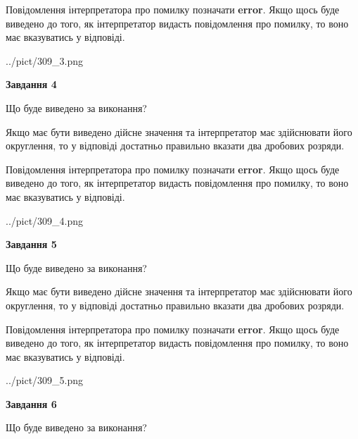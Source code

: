 \documentclass[12pt, ukrainian]{article}
\begin{document}
{\begin {Large}
Повідомлення інтерпретатора про помилку позначати \textbf{error}.
Якщо щось буде виведено до того, як інтерпретатор видасть повідомлення про помилку, 
то воно має вказуватись у відповіді. \par

\begin{center}
	{../pict/309_3.png}
\end{center}
\newpage

{\begin {center}\textbf{Завдання 4}\end {center}}\par
Що буде виведено за виконання? \par

Якщо має бути виведено дійсне значення та інтерпретатор має здійснювати його округлення, 
то у відповіді достатньо правильно вказати два дробових розряди.

Повідомлення інтерпретатора про помилку позначати \textbf{error}.
Якщо щось буде виведено до того, як інтерпретатор видасть повідомлення про помилку, 
то воно має вказуватись у відповіді. \par

\begin{center}
	{../pict/309_4.png}
\end{center}
\newpage

{\begin {center}\textbf{Завдання 5}\end {center}}\par
Що буде виведено за виконання? \par

Якщо має бути виведено дійсне значення та інтерпретатор має здійснювати його округлення, 
то у відповіді достатньо правильно вказати два дробових розряди.

Повідомлення інтерпретатора про помилку позначати \textbf{error}.
Якщо щось буде виведено до того, як інтерпретатор видасть повідомлення про помилку, 
то воно має вказуватись у відповіді. \par

\begin{center}
	{../pict/309_5.png}
\end{center}
\newpage

{\begin {center}\textbf{Завдання 6}\end {center}}\par
Що буде виведено за виконання? \par


\end{Large}}
\end{document}
